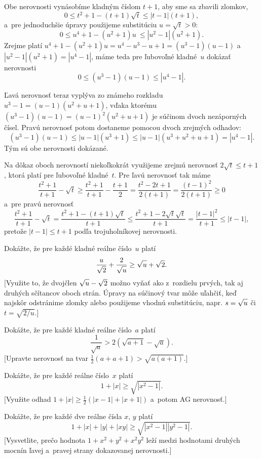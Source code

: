 {%
Obe nerovnosti vynásobíme kladným číslom $t+1$, aby sme sa zbavili zlomkov,
$$
0\le t^2+1-(t+1)\sqrt t \le |t-1|(t+1),
$$
a~pre jednoduchšie úpravy použijeme substitúciu $u=\sqrt t>0$:
$$
0\le u^4+1-(u^2+1)u~\le |u^2-1|(u^2+1).
$$
Zrejme platí $u^4+1-(u^2+1)u=u^4-u^3-u+1=(u^3-1)(u-1)$
a~$|u^2-1|(u^2+1)=|u^4-1|$, máme teda pre ľubovoľné
kladné~$u$ dokázať nerovnosti
$$
0\le (u^3-1)(u-1) \le |u^4-1|.
$$

Ľavá nerovnosť teraz vyplýva zo známeho rozkladu $u^3-1=(u-1)(u^2+u+1)$, vďaka
ktorému $(u^3-1)(u-1)=(u-1)^2(u^2+u+1)$ je súčinom dvoch nezáporných čísel.
Pravú nerovnosť potom dostaneme pomocou dvoch zrejmých odhadov:
$$
(u^3-1)(u-1) \le|u-1|(u^3+1)\le |u-1|(u^3+u^2+u+1)=|u^4-1|.
$$
Tým sú obe nerovnosti dokázané.

\ineres
Na dôkaz oboch nerovností niekoľkokrát využijeme zrejmú nerovnosť
$2\sqrt t\le t+1$, ktorá platí pre ľubovoľné kladné~$t$.
Pre ľavú nerovnosť tak máme
$$
\frac{t^2+1}{t+1}-\sqrt t \ge\frac{t^2+1}{t+1}-\frac{t+1}{2}
=\frac{t^2-2t+1}{2(t+1)}=\frac{(t-1)^2}{2(t+1)} \ge 0
$$
a~pre pravú nerovnosť
$$
\frac{t^2+1}{t+1}-\sqrt t
=\frac{t^2+1-(t+1)\sqrt t}{t+1}
\le\frac{t^2+1-2\sqrt t\sqrt t}{t+1}
=\frac{|t-1|^2}{t+1}\le|t-1|,
$$
pretože $|t-1| \le t+1$ podľa trojuholníkovej nerovnosti.


Dokážte, že pre každé kladné reálne číslo~$u$ platí
$$
\frac{u}{\sqrt{2}}+\frac{2}{\sqrt{\vphantom2u}} \ge\sqrt{\vphantom2u}+\sqrt{2}.
$$
[Využite to, že dvojčlen $\sqrt{\vphantom2u}-\sqrt{2}$ možno vyňať ako
z~rozdielu prvých, tak aj druhých sčítancov oboch strán.
Úpravy na súčinový tvar môže uľahčiť, keď najskôr odstránime zlomky
alebo použijeme vhodnú substitúciu, napr. $s=\sqrt{\vphantom2u}$ či $t=\sqrt{2/u}$.]

Dokážte, že pre každé kladné reálne číslo~$a$ platí
$$\frac{1}{\sqrt{a}} > 2(\sqrt{a+1}-\sqrt{a}).$$
[Upravte nerovnosť na tvar $\frac12(a+a+1)>\sqrt{a(a+1)}$.]

Dokážte, že pre každé reálne číslo~$x$ platí
$$1+|x| \ge \sqrt{|x^2-1|}.$$
[Využite odhad $1+|x|\ge\frac12(|x-1|+|x+1|)$ a~potom AG nerovnosť.]

Dokážte, že pre každé dve reálne čísla $x$, $y$ platí
$$1+|x|+|y|+|xy| \ge\sqrt{|x^2-1||y^2-1|}.$$
[Vysvetlite, prečo hodnota $1+x^2+y^2+x^2y^2$ leží medzi hodnotami
druhých mocnín ľavej a~pravej strany dokazovanej nerovnosti.]
}

